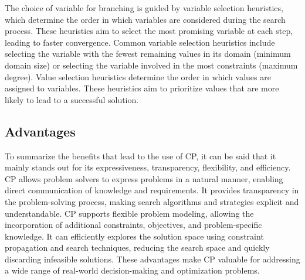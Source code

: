 The choice of variable for branching is guided by variable selection heuristics, which determine the order in which variables are considered during the search process. These heuristics aim to select the most promising variable at each step, leading to faster convergence. Common variable selection heuristics include selecting the variable with the fewest remaining values in its domain (minimum domain size) or selecting the variable involved in the most constraints (maximum degree). Value selection heuristics determine the order in which values are assigned to variables. These heuristics aim to prioritize values that are more likely to lead to a successful solution.

\subsection{Advantages}
To summarize the benefits that lead to the use of CP, it can be said that it mainly stands out for its expressiveness, transparency, flexibility, and efficiency. CP allows problem solvers to express problems in a natural manner, enabling direct communication of knowledge and requirements. It provides transparency in the problem-solving process, making search algorithms and strategies explicit and understandable. CP supports flexible problem modeling, allowing the incorporation of additional constraints, objectives, and problem-specific knowledge. It can efficiently explores the solution space using constraint propagation and search techniques, reducing the search space and quickly discarding infeasible solutions. These advantages make CP valuable for addressing a wide range of real-world decision-making and optimization problems.